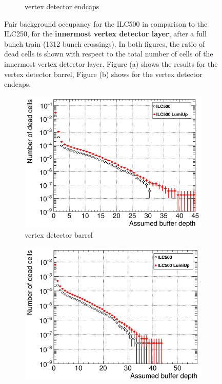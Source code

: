 \begin{figure}
\begin{subfigure}[b]{0.49\textwidth}
   \caption{\sid vertex detector endcaps}
   \end{subfigure}
   \caption[Pair background occupancy in the \sid vertex detector for the ILC500 and the ILC250]{Pair background occupancy for the ILC500 in comparison to the ILC250, for the \textbf{innermost \sid vertex detector layer}, after a full bunch train (1312 bunch crossings).
   In both figures, the ratio of dead cells is shown with respect to the total number of cells of the innermost vertex detector layer.
   Figure (a) shows the results for the vertex detector barrel, Figure (b) shows for the vertex detector endcaps.
   }
   \label{fig:PairBkg:ILC500-ILC250_Occupancy}
 \end{figure}
 
  \begin{figure}
 \centering
  \begin{subfigure}[b]{0.49\textwidth}
   \centering
    \includegraphics[width=\textwidth]{Figures/Pairs/Occupancy_Comparison_Layer_0_deadcells_ILC500_LumiUp.png}
   \caption{\sid vertex detector barrel}
   \end{subfigure}
   \hfill
    \begin{subfigure}[b]{0.49\textwidth}
   \centering
    \includegraphics[width=\textwidth]{Figures/Pairs/Occupancy_Comparison_Layer_0_deadcells_ILC500_LumiUp_SiVertexEndcap.png}

\end{subfigure}
\end{figure}
